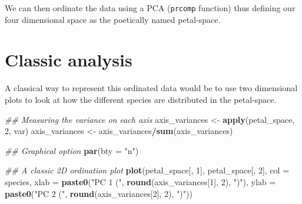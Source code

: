 \documentclass[]{book}
\newenvironment{Shaded}{\begin{snugshade}}{\end{snugshade}}
\newcommand{\CommentTok}[1]{\textcolor[rgb]{0.56,0.35,0.01}{\textit{#1}}}
\newcommand{\DataTypeTok}[1]{\textcolor[rgb]{0.13,0.29,0.53}{#1}}
\newcommand{\DecValTok}[1]{\textcolor[rgb]{0.00,0.00,0.81}{#1}}
\newcommand{\KeywordTok}[1]{\textcolor[rgb]{0.13,0.29,0.53}{\textbf{#1}}}
\newcommand{\NormalTok}[1]{#1}
\newcommand{\OperatorTok}[1]{\textcolor[rgb]{0.81,0.36,0.00}{\textbf{#1}}}
\newcommand{\StringTok}[1]{\textcolor[rgb]{0.31,0.60,0.02}{#1}}
\begin{document}
We can then ordinate the data using a PCA (\texttt{prcomp} function) thus defining our four dimensional space as the poetically named petal-space.

\begin{Shaded}
\end{Shaded}

\hypertarget{classic-analysis}{%
\section{Classic analysis}\label{classic-analysis}}

A classical way to represent this ordinated data would be to use two dimensional plots to look at how the different species are distributed in the petal-space.

\begin{Shaded}
\begin{Highlighting}[]
\CommentTok{## Measuring the variance on each axis}
\NormalTok{axis_variances <-}\StringTok{ }\KeywordTok{apply}\NormalTok{(petal_space, }\DecValTok{2}\NormalTok{, var)}
\NormalTok{axis_variances <-}\StringTok{ }\NormalTok{axis_variances}\OperatorTok{/}\KeywordTok{sum}\NormalTok{(axis_variances)}

\CommentTok{## Graphical option}
\KeywordTok{par}\NormalTok{(}\DataTypeTok{bty =} \StringTok{"n"}\NormalTok{)}

\CommentTok{## A classic 2D ordination plot}
\KeywordTok{plot}\NormalTok{(petal_space[, }\DecValTok{1}\NormalTok{], petal_space[, }\DecValTok{2}\NormalTok{], }\DataTypeTok{col =}\NormalTok{ species,}
    \DataTypeTok{xlab =} \KeywordTok{paste0}\NormalTok{(}\StringTok{"PC 1 ("}\NormalTok{, }\KeywordTok{round}\NormalTok{(axis_variances[}\DecValTok{1}\NormalTok{], }\DecValTok{2}\NormalTok{), }\StringTok{")"}\NormalTok{),}
    \DataTypeTok{ylab =} \KeywordTok{paste0}\NormalTok{(}\StringTok{"PC 2 ("}\NormalTok{, }\KeywordTok{round}\NormalTok{(axis_variances[}\DecValTok{2}\NormalTok{], }\DecValTok{2}\NormalTok{), }\StringTok{")"}\NormalTok{))}
\end{Highlighting}
\end{Shaded}
\end{document}
